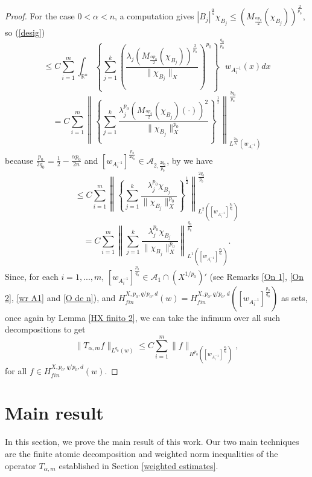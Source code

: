 \documentclass[oneside,10pt]{article}
\begin{document}
\begin{proof}
For the case $0 < \alpha < n$, a computation gives 
$|B_j|^{\frac{\alpha}{n}} \chi_{B_j} \leq \left(M_{\frac{\alpha p_0}{2}} (\chi_{B_j})\right)^{\frac{2}{p_0}}$, so (\ref{desig})
\[
\leq C \sum_{i=1}^{m} \int_{\mathbb{R}^{n}} \left\{\sum_{j=1}^{k} \left( \frac{\lambda_{j} 
\left(M_{\frac{\alpha p_0}{2}} (\chi_{B_j})\right)^{\frac{2}{p_0}}}{\| \chi_{B_j} \|_{X}}\right)^{p_0} \right\}^{\frac{q_0}{p_0}} 
w_{A_{i}^{-1}}(x) dx
\]
\[
= C \sum_{i=1}^{m} \left\| \left\{\sum_{j=1}^{k} \frac{\lambda_{j}^{p_0}  \left(M_{\frac{\alpha p_0}{2}} (\chi_{B_j})(\cdot)\right)^{2}}{\| \chi_{B_j} \|_{X}^{p_0}} \right\}^{\frac{1}{2}} \right\|^{\frac{2q_0}{p_0}}_{L^{\frac{2q_0}{p_0}}(w_{A_{i}^{-1}})}
\]
because $\frac{p_0}{2q_0} = \frac{1}{2} - \frac{\alpha p_0}{2n}$ 
and $[w_{A_i^{-1}}]^{\frac{p_0}{2q_0}} \in \mathcal{A}_{2, \frac{2q_0}{p_0}}$, by \cite[Lemma 2.13]{Rocha2018} we have
\[
\leq C \sum_{i=1}^{m} \left\| \left\{\sum_{j=1}^{k} \frac{\lambda_{j}^{p_0}  \chi_{B_j}}{\| \chi_{B_j} \|_{X}^{p_0}} \right\}^{\frac{1}{2}} \right\|^{\frac{2q_0}{p_0}}_{L^{2}\left([w_{A_{i}^{-1}}]^{\frac{p_0}{q_0}} \right)}
\]
\[
=C \sum_{i=1}^{m} \left\| \sum_{j=1}^{k} \frac{\lambda_{j}^{p_0}  \chi_{B_j}}{\| \chi_{B_j} \|_{X}^{p_0}}  \right\|^{\frac{q_0}{p_0}}_{L^{1}\left([w_{A_{i}^{-1}}]^{\frac{p_0}{q_0}} \right)}.
\]
Since, for each $i=1, ..., m$, $[w_{A_i^{-1}}]^{\frac{p_0}{q_0}} \in \mathcal{A}_1 \cap (X^{1/p_0})'$ (see Remarks \ref{On 1}, \ref{On 2}, 
\ref{wr A1} and \ref{O de n}), and $H^{X, p_0, q/p_0, d}_{fin}(w) = H^{X, p_0, q/p_0, d}_{fin}\left([w_{A_i^{-1}}]^{\frac{p_0}{q_0}} \right)$ as sets, once again by Lemma \ref{HX finito 2}, we can take the infimum over all such decompositions to get
\[
\| T_{\alpha, m} f \|_{L^{q_0}(w)} \leq C \sum_{i=1}^{m} \| f \|_{H^{p_0}\left( [w_{A_i^{-1}}]^{\frac{p_{0}}{q_{0}}} \right)},
\]
for all $f \in H^{X, p_0, q/p_0, d}_{fin}(w)$.
\end{proof}


\section{Main result} \label{resultados principales}

In this section, we prove the main result of this work. Our two main techniques are the finite atomic decomposition and weighted norm inequalities of the operator $T_{\alpha, m}$ established in Section \ref{weighted estimates}.
\end{document}
